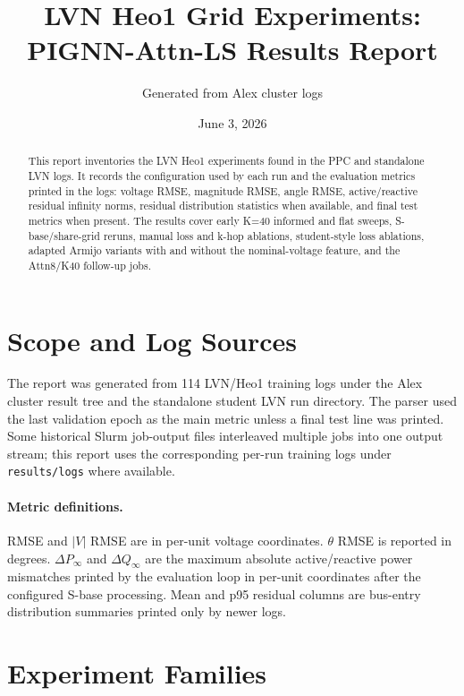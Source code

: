 \documentclass[10pt]{article}
\title{LVN Heo1 Grid Experiments: PIGNN-Attn-LS Results Report}
\author{Generated from Alex cluster logs}
\date{June 3, 2026}
\newcommand{\dP}{\Delta P}
\newcommand{\dQ}{\Delta Q}
\begin{document}
\maketitle
\begin{abstract}
This report inventories the LVN Heo1 experiments found in the PPC and standalone LVN logs. It records the configuration used by each run and the evaluation metrics printed in the logs: voltage RMSE, magnitude RMSE, angle RMSE, active/reactive residual infinity norms, residual distribution statistics when available, and final test metrics when present. The results cover early K=40 informed and flat sweeps, S-base/share-grid reruns, manual loss and k-hop ablations, student-style loss ablations, adapted Armijo variants with and without the nominal-voltage feature, and the Attn8/K40 follow-up jobs.
\end{abstract}


\section{Scope and Log Sources}
The report was generated from 114 LVN/Heo1 training logs under the Alex cluster result tree and the standalone student LVN run directory. The parser used the last validation epoch as the main metric unless a final test line was printed. Some historical Slurm job-output files interleaved multiple jobs into one output stream; this report uses the corresponding per-run training logs under \texttt{results/logs} where available.

\paragraph{Metric definitions.} RMSE and $|V|$ RMSE are in per-unit voltage coordinates. $\theta$ RMSE is reported in degrees. $\dP_\infty$ and $\dQ_\infty$ are the maximum absolute active/reactive power mismatches printed by the evaluation loop in per-unit coordinates after the configured S-base processing. Mean and p95 residual columns are bus-entry distribution summaries printed only by newer logs.

\section{Experiment Families}
\end{document}
